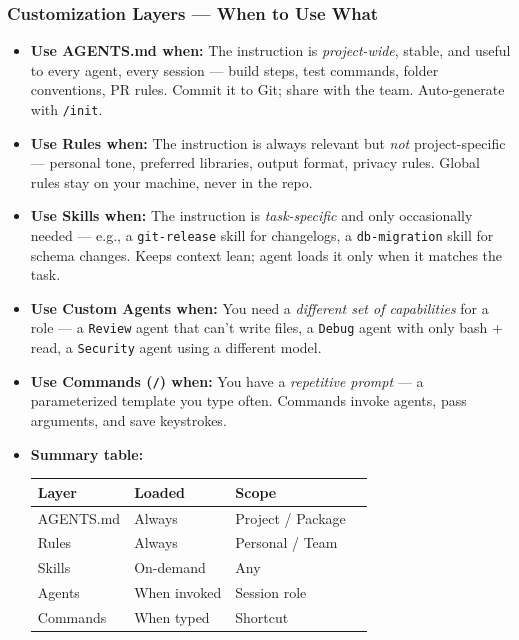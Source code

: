 \begin{frame}[fragile]\frametitle{Customization Layers — When to Use What}
  \begin{itemize}
    \item \textbf{Use AGENTS.md when:} The instruction is \textit{project-wide}, stable, and useful to every agent, every session — build steps, test commands, folder conventions, PR rules. Commit it to Git; share with the team. Auto-generate with \texttt{/init}.
    \item \textbf{Use Rules when:} The instruction is always relevant but \textit{not} project-specific — personal tone, preferred libraries, output format, privacy rules. Global rules stay on your machine, never in the repo.
    \item \textbf{Use Skills when:} The instruction is \textit{task-specific} and only occasionally needed — e.g., a \texttt{git-release} skill for changelogs, a \texttt{db-migration} skill for schema changes. Keeps context lean; agent loads it only when it matches the task.
    \item \textbf{Use Custom Agents when:} You need a \textit{different set of capabilities} for a role — a \texttt{Review} agent that can't write files, a \texttt{Debug} agent with only bash + read, a \texttt{Security} agent using a different model.
    \item \textbf{Use Commands (\texttt{/}) when:} You have a \textit{repetitive prompt} — a parameterized template you type often. Commands invoke agents, pass arguments, and save keystrokes.
    \item \textbf{Summary table:}
	
	
      \begin{tabular}{|l|l|l|l|}
        \hline
        \textbf{Layer} & \textbf{Loaded} & \textbf{Scope}  \\
        \hline
        AGENTS.md & Always & Project / Package  \\
        Rules & Always & Personal / Team  \\
        Skills & On-demand & Any  \\
        Agents & When invoked & Session role \\
        Commands & When typed & Shortcut  \\
        \hline
      \end{tabular}
  \end{itemize}
\end{frame}



